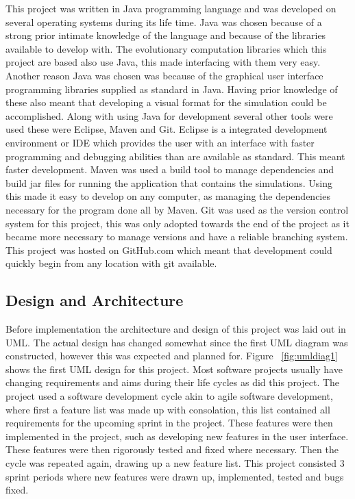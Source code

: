\documentclass[12pt]{article}
\begin{document}
This project was written in Java programming language and was developed on several operating systems during its life time. 
Java was chosen because of a strong prior intimate knowledge of the language and because of the libraries available to develop with. 
The evolutionary computation libraries which this project are based also use Java, this made interfacing with them very easy. 
Another reason Java was chosen was because of the graphical user interface programming libraries supplied as standard in Java. 
Having prior knowledge of these also meant that developing a visual format for the simulation could be accomplished.  Along with using 
Java for development several other tools were used these were Eclipse, Maven and Git. Eclipse is a integrated development environment or 
IDE which provides the user with an interface with faster programming and debugging abilities than are available as standard.
This meant faster development. Maven was used a build tool to manage dependencies and build jar files for running the application 
that contains the simulations. Using this made it easy to develop on any computer, as managing the dependencies necessary for the 
program done all by Maven. Git was used as the version control system for this project, this was only adopted towards the 
end of the project as it became more necessary to manage versions and have a reliable branching system. This project was hosted 
on GitHub.com which meant that development could quickly begin from any location with git available. 

\subsection{Design and Architecture}

Before implementation the architecture and design of this project was laid out in UML. The actual design has changed somewhat since the first UML diagram was
constructed, however this was expected and planned for. Figure ~\ref{fig:umldiag1} shows the first UML design for this project.
Most software projects usually have changing requirements and aims during their life cycles as did this project. The project 
used a software development cycle akin to agile software development, where first a feature list was made up with consolation, this
list contained all requirements for the upcoming sprint in the project. These features were then implemented in the project, such
as developing new features in the user interface. These features were then rigorously tested and fixed where necessary. Then 
the cycle was repeated again, drawing up a new feature list.  This project consisted 3 sprint periods where new features 
were drawn up, implemented, tested and bugs fixed.
\end{document}
